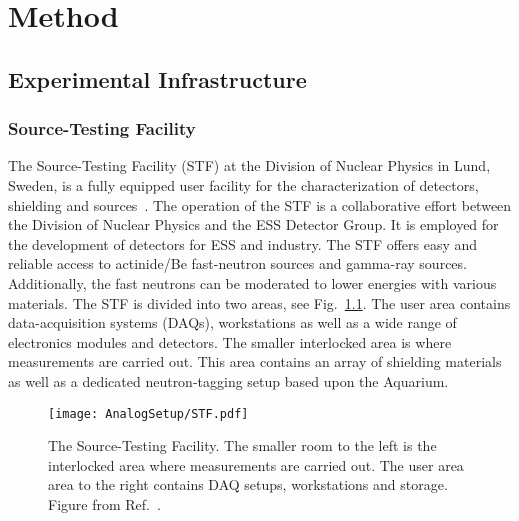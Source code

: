 \documentclass[main.tex]{subfiles}
\begin{document}
\chapter{Method}
\section{Experimental Infrastructure}
\subsection{Source-Testing Facility}
The Source-Testing Facility (STF) at the Division of Nuclear Physics in Lund, Sweden, is a fully equipped user facility for the characterization of detectors, shielding and sources~\cite{Messi}.
The operation of the STF is a collaborative effort between the Division of Nuclear Physics and the ESS Detector Group. It is employed for the development of detectors for ESS and industry. The STF offers easy and reliable access to actinide/Be fast-neutron sources and gamma-ray sources. Additionally, the fast neutrons can be moderated to lower energies with various materials. The STF is divided into two areas, see Fig.~\ref{fig:STF}. The user area contains data-acquisition systems (DAQs), workstations as well as a wide range of electronics modules and detectors. The smaller interlocked area is where measurements are carried out. This area contains an array of shielding materials as well as a dedicated neutron-tagging setup based upon the Aquarium.

\begin{figure}[ht]
	\center
    	\texttt{[image: AnalogSetup/STF.pdf]}
	\caption[The Source-Testing Facility.]{The Source-Testing Facility. The smaller room to the left is the interlocked area where measurements are carried out. The user area area to the right contains DAQ setups, workstations and storage. Figure from Ref.~\cite{Messi}.}
	\label{fig:STF}
\end{figure}
\end{document}
